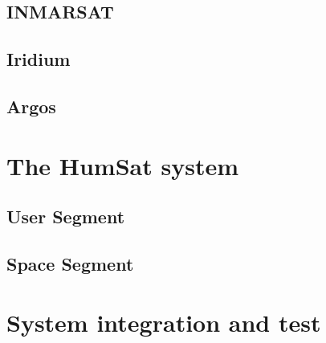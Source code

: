 \subsection{INMARSAT}
\label{sec:INMARSAT}

 {\small\textit{\lipsum[1-2]}}

\subsection{Iridium}
\label{sec:Iridium}

 {\small\textit{\lipsum[1-2]}}

\subsection{Argos}
\label{sec:Argos}

 {\small\textit{\lipsum[1-2]}}


\section{The HumSat system}
\label{sec:NetworkOp_HumSat}

 {\small\textit{\lipsum[1-2]}}

\subsection{User Segment}
\label{sec:HumSat_User}

 {\small\textit{\lipsum[1-2]}}

\subsection{Space Segment}
\label{sec:HumSat_Space}

 {\small\textit{\lipsum[1-2]}}
    

\section{System integration and test}
\label{sec:NetworkOp_Integration}

